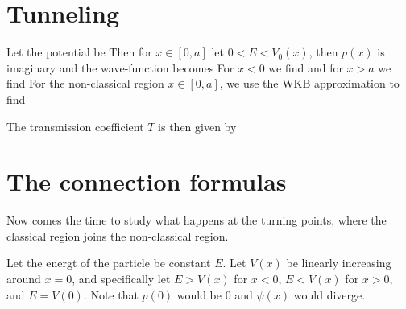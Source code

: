\documentclass[oneside, 12pt, notitlepage]{book}
\begin{document}
\begin{example}

\end{example}


\section{Tunneling}

Let the potential be
Then for \(x\in[0,a]\) let \(0 < E < V_0(x)\), then \(p(x)\) is imaginary and the wave-function becomes
For \(x<0\) we find
and for \(x>a\) we find
For the non-classical region \(x\in [0,a]\), we use the WKB approximation to find
\par

The transmission coefficient \(T\)
is then given by

\begin{example}


\end{example}

\section{The connection formulas}

Now comes the time to study what happens at the turning points, where the classical region joins the non-classical region.\par


Let the energt of the particle be constant \(E\). Let \(V(x)\) be linearly increasing around \(x=0\), and specifically let \(E > V(x)\) for \(x<0\), \(E < V(x)\) for \(x>0\), and \(E = V(0)\). Note that \(p(0)\) would be \(0\) and \(\psi(x)\) would diverge.\par
\end{document}
